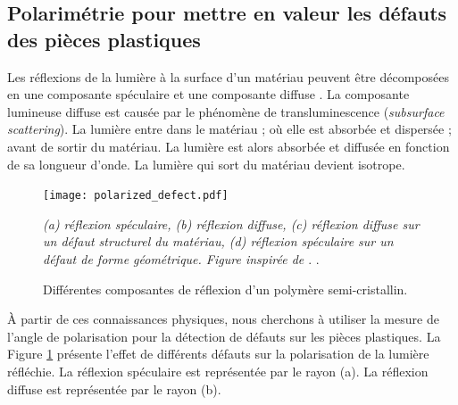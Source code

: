 \subsection{Polarimétrie pour mettre en valeur les défauts des pièces plastiques}
Les réflexions de la lumière à la surface d'un matériau peuvent être décomposées en une composante spéculaire et une composante diffuse \cite{hanrahan_reflection_1993}.
La composante lumineuse diffuse est causée par le phénomène de transluminescence (\textit{subsurface scattering}).
La lumière entre dans le matériau ; où elle est absorbée et dispersée ; avant de sortir du matériau.
La lumière est alors absorbée et diffusée en fonction de sa longueur d'onde.
La lumière qui sort du matériau devient isotrope.  %

\begin{figure}[tbhp]
	\centering
	\texttt{[image: polarized\_defect.pdf]}
	\caption{Différentes composantes de réflexion d'un polymère semi-cristallin.}
	\textit{(a) réflexion spéculaire, (b) réflexion diffuse, (c) réflexion diffuse sur un défaut structurel du matériau, (d) réflexion spéculaire sur un défaut de forme géométrique. Figure inspirée de \cite{debevec_acquiring_2000}}.
	\label{fig:polarized_defect}.
\end{figure}

À partir de ces connaissances physiques, nous cherchons à utiliser la mesure de l'angle de polarisation pour la détection de défauts sur les pièces plastiques.
La Figure \ref{fig:polarized_defect} présente l'effet de différents défauts sur la polarisation de la lumière réfléchie.
La réflexion spéculaire est représentée par le rayon (a).
La réflexion diffuse est représentée par le rayon (b).

